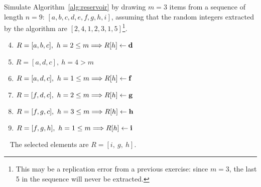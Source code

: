 \exercise

Simulate Algorithm~\ref{alg:reservoir} by drawing $m = 3$ items from a sequence
of length $n = 9$: $[a, b, c, d, e, f, g, h, i]$, assuming that the random
integers extracted by the algorithm are $[2, 4, 1, 2, 3, 1, 5]$\footnote{This
may be a replication error from a previous exercise: since $m = 3$, the last 5
in the sequence will never be extracted.}.

\solution

\begin{enumerate}[\bf a.]
  \setcounter{enumi}{3}
  \item $R = [a, b, c],\ h = 2 \le m \Longrightarrow R[h] \gets \text{\bf d}$
  \item $R = [a, d, c],\ h = 4 > m$
  \item $R = [a, d, c],\ h = 1 \le m \Longrightarrow R[h] \gets \text{\bf f}$
  \item $R = [f, d, c],\ h = 2 \le m \Longrightarrow R[h] \gets \text{\bf g}$
  \item $R = [f, g, c],\ h = 3 \le m \Longrightarrow R[h] \gets \text{\bf h}$
  \item $R = [f, g, h],\ h = 1 \le m \Longrightarrow R[h] \gets \text{\bf i}$
\end{enumerate}\
%
The selected elements are $R = [ i,\ g,\ h ]$.
